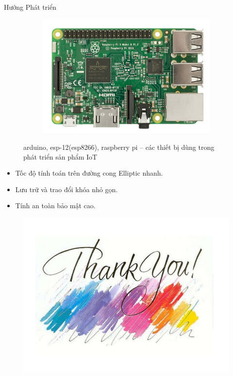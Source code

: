 \documentclass[compress]{beamer}
\begin{document}
\begin{frame}{Hướng Phát triển}
\begin{figure}[h]
\begin{subfigure}{.3\textwidth}
  \label{fig:sfig2}
\end{subfigure}
\begin{subfigure}{.3\textwidth}
  \centering
  \includegraphics[width=1\linewidth]{../ras.jpg}
  \label{fig:sfig2}
\end{subfigure}
\caption{arduino, esp-12(esp8266), raspberry pi – các thiết bị dùng trong phát triển sản phẩm IoT} \label{h6.3}
\end{figure}
\begin{itemize}
\item Tốc độ tính toán trên đường cong Elliptic nhanh.
\item Lưu trữ và trao đổi khóa nhỏ gọn.
\item Tính an toàn bảo mật cao.
\end{itemize}
\end{frame}
\begin{frame}
\begin{center}
\begin{figure}
\centering
\includegraphics[width=0.9\linewidth]{../thanks.jpg}
\end{figure}
\end{center}
\end{frame}
\end{document}
